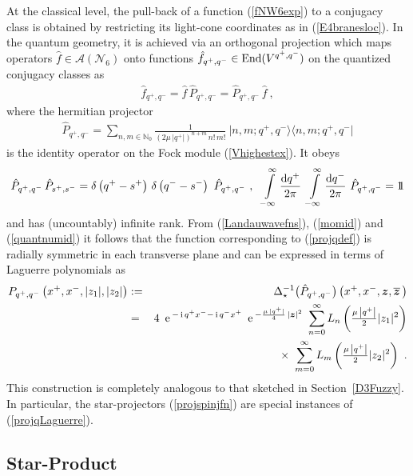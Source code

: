 \documentclass[11pt,a4paper]{article}
\newcommand{\ii}{{\rm i}}
\newcommand{\mbf}[1]{{\boldsymbol {#1} }}
\def\ii{{\,{\rm i}\,}}
\def\dd{{\rm d}}
\def\mz{{\mbf z}}
\newcommand{\nat}{{\mathbb N}} %
\newcommand{\id}{{1\!\!1}} %
\def\e{{\,\rm e}\,}
\def\bea{\begin{eqnarray}}
\def\eea{\end{eqnarray}}
\newcommand{\beq}{\begin{eqnarray}}
\newcommand{\eeq}{\end{eqnarray}}
\begin{document}
At the classical level, the pull-back of a function (\ref{fNW6exp}) to
a conjugacy class is obtained by restricting its light-cone
coordinates as in (\ref{E4branesloc}). In the quantum geometry, it is
achieved via an orthogonal projection which maps operators $\hat
f\in\mathcal{A}(\mathcal{N}_6)$ onto functions $\hat f_{q^+,q^-}\in{\rm
  End}(V^{q^+,q^-})$ on the quantized conjugacy classes as
\beq
\hat f_{q^+,q^-}=\hat f\,\hat P_{q^+,q^-}=\hat P_{q^+,q^-}\,\hat f \ ,
\label{orthoprojfns}\eeq
where the hermitian projector
\beq
\hat P_{q^+,q^-}=\sum_{n,m\in\nat_0}\mbox{$\frac1{\left(2\mu\,\left|q^+
\right|\right)^{n+m}\,n!\,m!}$}~\bigl|n,m;q^+,q^-\bigr\rangle
\bigl\langle n,m;q^+,q^-\bigr|
\label{projqdef}\eeq
is the identity operator on the Fock module (\ref{Vhighestex}). It
obeys
\beq
\hat P_{q^+,q^-}\,\hat P_{s^+,s^-}=\delta\left(q^+-s^+\right)\,
\delta\left(q^--s^-\right)~\hat P_{q^+,q^-}\ , ~~
\int\limits_{-\infty}^\infty\frac{\dd q^+}{2\pi}~
\int\limits_{-\infty}^\infty\frac{\dd q^-}{2\pi}~\hat P_{q^+,q^-}
=\id
\label{projqprops}\eeq
and has (uncountably) infinite rank. From (\ref{Landauwavefns}),
(\ref{momid}) and (\ref{quantnumid}) it follows that the function
corresponding to (\ref{projqdef}) is radially symmetric in each
transverse plane and can be expressed in terms of Laguerre polynomials
as
\bea
P_{q^+,q^-}\left(x^+,x^-,|z_1|,|z_2|\right)&:=&\Delta_\star^{-1}\bigl(
\hat P_{q^+,q^-}\bigr)\left(x^+,x^-,\mz,\overline{\mz}\,\right)
\nonumber\\ &=&4~\e^{-\ii q^+x^--\ii q^-x^+}~\e^{-\frac{\mu\,|q^+|}4\,
|\mz|^2}~\sum_{n=0}^\infty L_n\left(\mbox{$\frac{\mu\,\left|q^+\right|}2$}
|z_1|^2\right)\nonumber\\ &&\times~
\sum_{m=0}^\infty L_m\left(\mbox{$\frac{\mu\,\left|q^+\right|}2$}
|z_2|^2\right) \ .
\label{projqLaguerre}\eea
This construction is completely analogous to that sketched in
Section~\ref{D3Fuzzy}. In particular, the star-projectors
(\ref{projspinjfn}) are special instances of (\ref{projqLaguerre}).

\subsection{Star-Product\label{NW6Star}}
\end{document}
